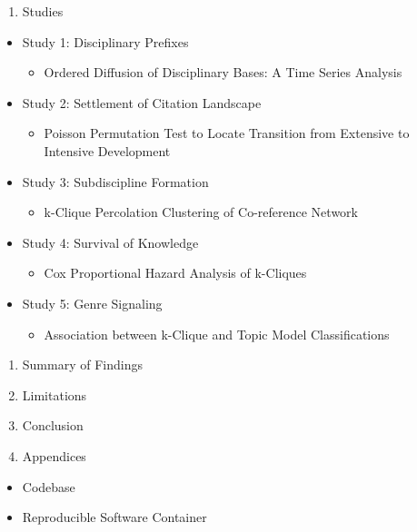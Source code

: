 \begin{enumerate}
\def\labelenumi{\arabic{enumi}.}
\setcounter{enumi}{5}
\tightlist
\item
  Studies
\end{enumerate}

\begin{itemize}
\tightlist
\item
  Study 1: Disciplinary Prefixes

  \begin{itemize}
  \tightlist
  \item
    Ordered Diffusion of Disciplinary Bases: A Time Series Analysis
  \end{itemize}
\item
  Study 2: Settlement of Citation Landscape

  \begin{itemize}
  \tightlist
  \item
    Poisson Permutation Test to Locate Transition from Extensive to
    Intensive Development
  \end{itemize}
\item
  Study 3: Subdiscipline Formation

  \begin{itemize}
  \tightlist
  \item
    k-Clique Percolation Clustering of Co-reference Network
  \end{itemize}
\item
  Study 4: Survival of Knowledge

  \begin{itemize}
  \tightlist
  \item
    Cox Proportional Hazard Analysis of k-Cliques
  \end{itemize}
\item
  Study 5: Genre Signaling

  \begin{itemize}
  \tightlist
  \item
    Association between k-Clique and Topic Model Classifications
  \end{itemize}
\end{itemize}

\begin{enumerate}
\def\labelenumi{\arabic{enumi}.}
\setcounter{enumi}{6}
\tightlist
\item
  Summary of Findings
\item
  Limitations
\item
  Conclusion
\item
  Appendices
\end{enumerate}

\begin{itemize}
\tightlist
\item
  Codebase
\item
  Reproducible Software Container
\end{itemize}
